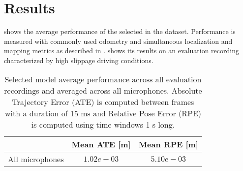 \section{Results} \label{sec:results}

 shows the average performance of the
selected in the  dataset. Performance is
measured with commonly used odometry and simultaneous localization and mapping
metrics as described in \cite{Measuring2019}.  shows its
results on an evaluation recording characterized by high slippage driving
conditions.

\begin{table}
    \centering
    \begin{tabular}{|c|c|c|}
        \hline
                        & Mean ATE [m] & Mean RPE [m] \\ \hline
        All microphones & $1.02e-03$   & $5.10e-03$     \\
        \hline
    \end{tabular}
    \caption[Selected model average performance across evaluation recordings
        and microphones]{Selected model average performance across all
        evaluation recordings and averaged across all microphones. Absolute
        Trajectory Error (ATE) is computed between frames with a duration of
        15 ms and Relative Pose Error (RPE) \cite{Measuring2019} is computed
        using time windows 1 s long.}
    \label{table:results-selected-model}
\end{table}


\begin{figure*}
    \centering
\end{figure*}

